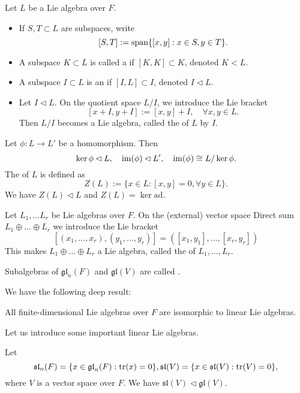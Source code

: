 \begin{definition}
	Let $L$ be a Lie algebra over $F$.
	\begin{itemize}
		\item If $S, T \subset L$ are subspaces, write
			\[
				[S, T] := \operatorname{span}\{[x, y]: x\in S, y\in T\}.
			\]
		\item A subspace $K \subset L$ is called a  if
			$[K, K] \subset K$, denoted $K < L$.
		\item A subspace $I \subset L$ is an  if $[I, L] \subset I$,
			denoted $I \lhd L$.
		\item Let $I\lhd L$. On the quotient space $L / I$,
			we introduce the Lie bracket
			\[
				[x + I, y + I] := [x, y] + I, \quad \forall x, y\in L.
			\]
			Then $L/ I$ becomes a Lie algebra, called the 
			of $L$ by $I$.
	\end{itemize}
\end{definition}

\begin{example}
    Let $\phi: L\to L'$ be a homomorphism. Then
	\[
	\ker \phi \lhd L, \quad \operatorname{im}(\phi) \lhd L', \quad \operatorname{im}(\phi) \cong L / \ker \phi.
	\]
	The  of $L$ is defined as
	\[
		Z(L) := \{x\in L: [x,y] = 0, \forall y\in L\}.
	\]
	We have $Z(L) \lhd L$ and $Z(L) = \ker \mathrm{ad}$.
\end{example}

\begin{definition}
	Let $L_1, \dots L_r$ be Lie algebras over $F$. On the (external) vector space
	Direct sum $L_1\oplus\dots\oplus L_r$ we introduce the Lie bracket
	\[
		[(x_1,\dots,x_r), (y_1,\dots, y_r)] = ([x_1,y_1], \dots, [x_r, y_r])
	\]
	This makes $L_1\oplus\dots\oplus L_r$ a Lie algebra, called the
	 of $L_1, \dots, L_r$.
\end{definition}

\begin{definition}
	Subalgebras of $\mathfrak{gl}_n(F)$ and $\mathfrak{gl}(V)$ are called
	.
\end{definition}

We have the following deep result:
\begin{theorem}
    All finite-dimensional Lie algebras over $F$ are isomorphic to linear Lie
	algebras.
\end{theorem}

Let us introduce some important linear Lie algebras.
\begin{example}
    Let
	\[
	\mathfrak{sl}_n(F) = \{x\in \mathfrak{gl}_n(F): \operatorname{tr}(x) = 0\},
	\mathfrak{sl}(V) = \{x\in \mathfrak{sl}(V): \operatorname{tr}(V) = 0\},
	\]
	where $V$ is a vector space over $F$.
	We have $\mathfrak{sl}(V) \lhd \mathfrak{gl}(V)$.
\end{example}

